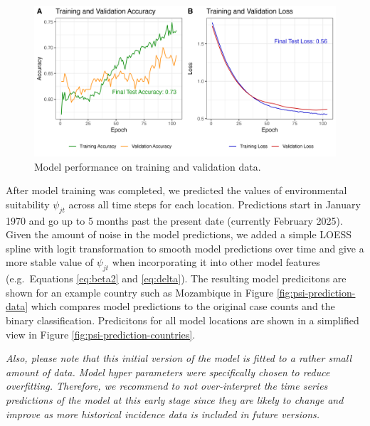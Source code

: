 \documentclass[
]{book}
\begin{document}
\begin{figure}

{\centering \includegraphics[width=1\linewidth]{figures/suitability_LSTM_fit} 

}

\caption{Model performance on training and validation data.}\label{fig:lstm-model-fit}
\end{figure}

After model training was completed, we predicted the values of environmental suitability \(\psi_{jt}\) across all time steps for each location. Predictions start in January 1970 and go up to 5 months past the present date (currently February 2025). Given the amount of noise in the model predictions, we added a simple LOESS spline with logit transformation to smooth model predictions over time and give a more stable value of \(\psi_{jt}\) when incorporating it into other model features (e.g.~Equations \eqref{eq:beta2} and \eqref{eq:delta}). The resulting model predicitons are shown for an example country such as Mozambique in Figure \ref{fig:psi-prediction-data} which compares model predictions to the original case counts and the binary classification. Predicitons for all model locations are shown in a simplified view in Figure \ref{fig:psi-prediction-countries}.

\emph{Also, please note that this initial version of the model is fitted to a rather small amount of data. Model hyper parameters were specifically chosen to reduce overfitting. Therefore, we recommend to not over-interpret the time series predictions of the model at this early stage since they are likely to change and improve as more historical incidence data is included in future versions.}
\end{document}
